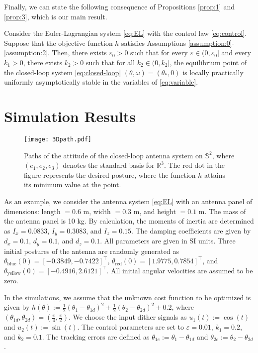 \documentclass{ifacconf}
\begin{document}
Finally, we can state the following consequence of Propositions \ref{prop:1} and \ref{prop:3}, which is our main result.
\begin{prop}\label{prop:4}
    Consider the Euler-Lagrangian system \eqref{eq:EL} with the control law \eqref{eq:control}. Suppose that the objective function $h$ satisfies Assumptions \ref{assumption:0}-\ref{assumption:2}. Then, there exists $\varepsilon_0>0$ such that for every $\varepsilon\in(0,\varepsilon_0]$ and every $k_1>0$, there exists $\bar{k}_2>0$ such that for all $k_2\in(0,\bar{k}_2]$, the equilibrium point of the closed-loop system \eqref{eq:closed-loop} $(\theta,\omega)=(\theta_*,0)$ is locally practically uniformly asymptotically stable in the variables of \eqref{eq:variable}.
\end{prop} 

\section{Simulation Results}\label{sec:simulation}

\begin{figure}[t]
\begin{center}
\texttt{[image: 3Dpath.pdf]}    %
\caption{Paths of the attitude of the closed-loop antenna system on $\mathbb{S}^2$, where $(e_1,e_2,e_3)$ denotes the standard basis for $\mathbb{R}^3$. The red dot in the figure represents the desired posture, where the function $h$ attains its minimum value at the point.} 
\label{fig:3D}
\end{center}
\end{figure}

As an example, we consider the antenna system \eqref{eq:EL} with an antenna panel of dimensions: length $= 0.6$ m, width $= 0.3$ m, and height $= 0.1$ m. The mass of the antenna panel is 10 kg.  By calculation, the moments of inertia are determined as $ I_x = 0.0833 $, $ I_y = 0.3083 $, and $ I_z = 0.15 $. The damping coefficients are given by $ d_x = 0.1 $, $ d_y = 0.1 $, and $ d_z = 0.1 $. All parameters are given in SI units. Three initial postures of the antenna are randomly generated as $\theta_{\text{blue}}(0)=[-0.3849,-0.7422]^\top$, $\theta_{\text{red}}(0)=[1.9775,0.7854]^\top$, and $\theta_{\text{yellow}}(0)=[-0.4916, 2.6121]^\top$. All initial angular velocities are assumed to be zero.

In the simulations, we assume that the unknown cost function to be optimized is given by  $h(\theta):= \frac{1}{2}(\theta_1 - \theta_{1d})^2 + \frac{1}{2}(\theta_2 - \theta_{2d})^2 + 0.2$, where \( (\theta_{1d}, \theta_{2d}) = \left( \frac{\pi}{4}, \frac{\pi}{2} \right) \). We choose the input dither signals as \( u_1(t) := \cos(t) \) and \( u_2(t) := \sin(t) \). The control parameters are set to \( \varepsilon = 0.01 \), \( k_1 = 0.2 \), and \( k_2 = 0.1 \). The tracking errors are defined as \( \theta_{1e} := \theta_1 - \theta_{1d} \) and \( \theta_{2e} := \theta_2 - \theta_{2d} \). 
\end{document}

